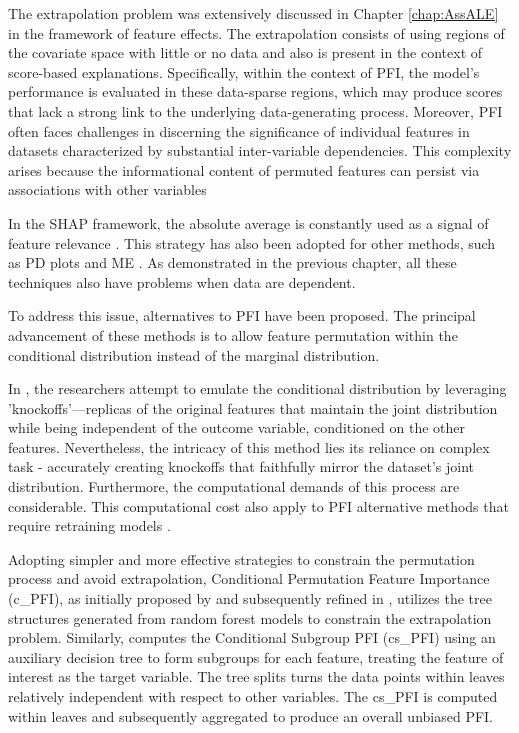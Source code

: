 The extrapolation problem was extensively discussed in Chapter \ref{chap:AssALE} in the framework of feature effects. The extrapolation consists of using regions of the covariate space with little or no data and also is present in the context of score-based explanations. Specifically, within the context of PFI, the model's performance is evaluated in these data-sparse regions, which may produce scores that lack a strong link to the underlying data-generating process. Moreover, PFI often faces challenges in discerning the significance of individual features in datasets characterized by substantial inter-variable dependencies. This complexity arises because the informational content of permuted features can persist via associations with other variables \cite{Strobl2008ConditionalForests, Hooker2019UnrestrictedImportance}

In the SHAP framework, the absolute average is constantly used as a signal of feature relevance \cite{Scavuzzo2022FeatureSHAP}. This strategy has also been adopted for other methods, such as PD plots \cite{Greenwell2018AMeasure} and ME 
\cite{Long2021UsingOutcomes}. As demonstrated in the previous chapter, all these techniques also have problems when data are dependent.

To address this issue, alternatives to PFI have been proposed. The principal advancement of these methods is to allow feature permutation within the conditional distribution instead of the marginal distribution.

In \cite{Candes2018PanningSelection, Watson2021TestingAlgorithms}, the researchers attempt to emulate the conditional distribution by leveraging 'knockoffs'—replicas of the original features that maintain the joint distribution while being independent of the outcome variable, conditioned on the other features. Nevertheless, the intricacy of this method lies its reliance on complex task -  accurately creating knockoffs that faithfully mirror the dataset's joint distribution. Furthermore, the computational demands of this process are considerable. This computational cost also apply to PFI alternative methods that require retraining models \cite{Hooker2019UnrestrictedImportance, Lei2018Distribution-FreeRegression, Gregorutti2017CorrelationForests}.

Adopting simpler and more effective strategies to constrain the permutation process and avoid extrapolation, Conditional Permutation Feature Importance (c\_PFI), as initially proposed by \cite{Strobl2008ConditionalForests} and subsequently refined in \cite{Debeer2020ConditionalRevisited}, utilizes the tree structures generated from random forest models to constrain the extrapolation problem. Similarly, \cite{Molnar2023Model-agnosticApproach} computes the Conditional Subgroup PFI (cs\_PFI) using an auxiliary decision tree to form subgroups for each feature, treating the feature of interest as the target variable. The tree splits turns the data points within leaves relatively independent with respect to other variables. The cs\_PFI is computed within leaves and subsequently aggregated to produce an overall unbiased PFI.

